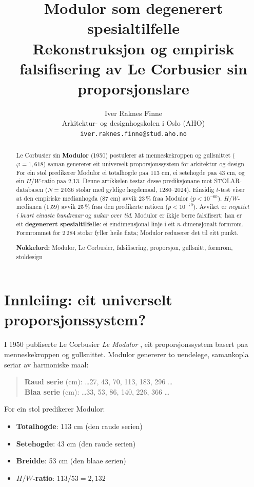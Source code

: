 \documentclass[10pt, a4paper, twocolumn]{article}
\title{%
  \textbf{Modulor som degenerert spesialtilfelle}\\[0.3em]
  \large Rekonstruksjon og empirisk falsifisering av Le Corbusier sin proporsjonslare%
}
\author{%
  Iver Raknes Finne\\
  \small Arkitektur- og designhogskolen i Oslo (AHO)\\
  \small \texttt{iver.raknes.finne@stud.aho.no}
}
\date{}
\begin{document}
\maketitle

\begin{abstract}
\noindent Le Corbusier sin \textbf{Modulor} (1950) postulerer at menneskekroppen og gullsnittet ($\varphi = 1{,}618$) saman genererer eit universelt proporsjonssystem for arkitektur og design. For ein stol predikerer Modulor ei totalhogde paa 113 cm, ei setehogde paa 43 cm, og ein $H/W$-ratio paa 2,13. Denne artikkelen testar desse prediksjonane mot STOLAR-databasen ($N = 2\,036$ stolar med gyldige hogdemaal, 1280--2024). Einsidig $t$-test viser at den empiriske medianhogda (87 cm) avvik 23\,\% fraa Modulor ($p < 10^{-60}$). $H/W$-medianen (1,59) avvik 25\,\% fraa den predikerte ratioen ($p < 10^{-70}$). Avviket er \emph{negativt i kvart einaste hundreaar} og \emph{aukar over tid}. Modulor er ikkje berre falsifisert; han er eit \textbf{degenerert spesialtilfelle}: ei eindimensjonal linje i eit $n$-dimensjonalt formrom. Formrommet for 2\,284 stolar fyller heile flata; Modulor reduserer det til eitt punkt.

\medskip
\noindent\textbf{Nokkelord:} Modulor, Le Corbusier, falsifisering, proporsjon, gullsnitt, formrom, stoldesign
\end{abstract}


\section{Innleiing: eit universelt proporsjonssystem?}

I 1950 publiserte Le Corbusier \emph{Le Modulor} \citep{lecorbusier1950}, eit proporsjonssystem basert paa menneskekroppen og gullsnittet. Modulor genererer to uendelege, samankopla seriar av harmoniske maal:

\begin{quote}
\textbf{Raud serie} (cm): \ldots 27, 43, 70, 113, 183, 296 \ldots\\
\textbf{Blaa serie} (cm): \ldots 33, 53, 86, 140, 226, 366 \ldots
\end{quote}

For ein stol predikerer Modulor:
\begin{itemize}
  \item \textbf{Totalhogde}: 113 cm (den raude serien)
  \item \textbf{Setehogde}: 43 cm (den raude serien)
  \item \textbf{Breidde}: 53 cm (den blaae serien)
  \item \textbf{$H/W$-ratio}: $113/53 = 2{,}132$
\end{itemize}
\end{document}
